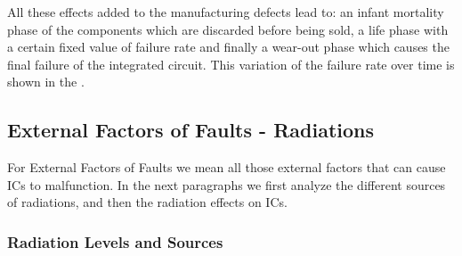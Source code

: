 {{{		
			All these effects added to the manufacturing defects lead to: an infant mortality phase of the components which are discarded before being sold, a life phase with a certain fixed value of failure rate and finally a wear-out phase which causes the final failure of the integrated circuit. This variation of the failure rate over time is shown in the .
			\vspace{2cm}
		
		}%
		\subsection{External Factors of Faults - Radiations}{
			For External Factors of Faults we mean all those external factors that can cause ICs to malfunction. In the next paragraphs we first analyze the different sources of radiations, and then the radiation effects on ICs.
		
			\subsubsection{Radiation Levels and Sources}{
				
				
}}}}
